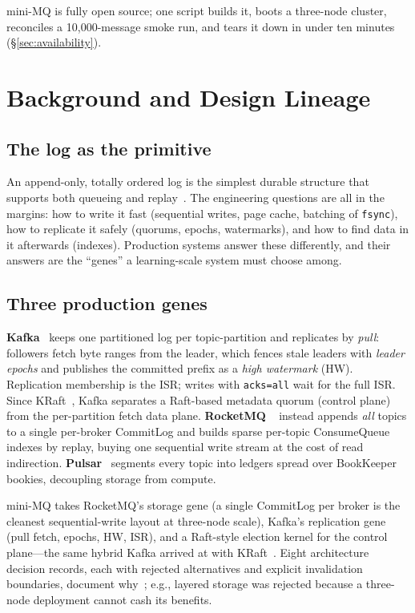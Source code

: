 \documentclass[letterpaper,twocolumn,10pt]{article}
\begin{document}
mini-MQ is fully open source; one script builds it, boots a three-node
cluster, reconciles a 10{,}000-message smoke run, and tears it down in
under ten minutes (\S\ref{sec:availability}).

\section{Background and Design Lineage}

\subsection{The log as the primitive}
An append-only, totally ordered log is the simplest durable structure that
supports both queueing and replay~\cite{kreps13log}. The engineering
questions are all in the margins: how to write it fast (sequential writes,
page cache, batching of \texttt{fsync}), how to replicate it safely
(quorums, epochs, watermarks), and how to find data in it afterwards
(indexes). Production systems answer these differently, and their answers
are the ``genes'' a learning-scale system must choose among.

\subsection{Three production genes}
\textbf{Kafka}~\cite{kreps11kafka,kafkadocs} keeps one partitioned log per
topic-partition and replicates by \emph{pull}: followers fetch byte ranges
from the leader, which fences stale leaders with \emph{leader epochs} and
publishes the committed prefix as a \emph{high watermark} (HW). Replication
membership is the ISR; writes with \texttt{acks=all} wait for the full ISR.
Since KRaft~\cite{kip500}, Kafka separates a Raft-based metadata quorum
(control plane) from the per-partition fetch data plane. \textbf{RocketMQ}%
~\cite{rocketmqdocs} instead appends \emph{all} topics to a single
per-broker CommitLog and builds sparse per-topic ConsumeQueue indexes by
replay, buying one sequential write stream at the cost of read
indirection. \textbf{Pulsar}~\cite{pulsardocs} segments every topic into
ledgers spread over BookKeeper bookies, decoupling storage from compute.

mini-MQ takes RocketMQ's storage gene (a single CommitLog per broker is the
cleanest sequential-write layout at three-node scale), Kafka's replication
gene (pull fetch, epochs, HW, ISR), and a Raft-style election kernel for
the control plane---the same hybrid Kafka arrived at with
KRaft~\cite{ongaro14raft,kip500}. Eight architecture decision records,
each with rejected alternatives and explicit invalidation boundaries,
document why~\cite{nygard11adr}; e.g., layered storage was rejected
because a three-node deployment cannot cash its benefits.
\end{document}
